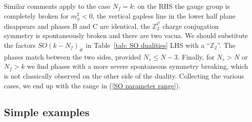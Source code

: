 \documentclass[a4paper, 12pt]{article}
\numberwithin{equation}{section}
\newcommand{\cC}{\mathcal{C}}
\newcommand{\bZ}{\mathbb{Z}}
\begin{document}
Similar comments apply to the case $N_f = k$: on the RHS the gauge group is completely broken for $m_\phi^2<0$, the vertical gapless line in the lower half plane disappears  and phases B and C are identical, the $\bZ_2^\cC$ charge conjugation symmetry is spontaneously broken and there are two vacua. We should substitute the factors $SO(k-N_f)_\#$ in Table~\ref{tab: SO dualities} LHS with a ``$\bZ_2$''. The phases match between the two sides, provided $N_s \leq N-3$. Finally, for $N_s > N$ or $N_f > k$ we find phases with a more severe spontaneous symmetry breaking, which is not classically observed on the other side of the duality. Collecting the various cases, we end up with the range in (\ref{SO parameter range}).





\subsection{Simple examples}
\end{document}
